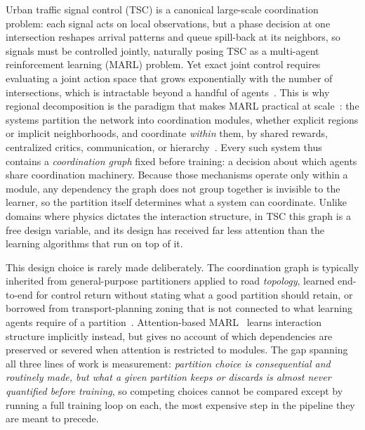\documentclass[journal]{IEEEtran}
\theoremstyle{definition}
\begin{document}
Urban traffic signal control (TSC) is a canonical large-scale coordination problem: each signal acts on local observations, but a phase decision at one intersection reshapes arrival patterns and queue spill-back at its neighbors, so signals must be controlled jointly, naturally posing TSC as a multi-agent reinforcement learning (MARL) problem. Yet exact joint control requires evaluating a joint action space that grows exponentially with the number of intersections, which is intractable beyond a handful of agents~\citep{nair2005ndpomdp,kok2006ndpomdp,oliehoek2012ndpomdp}. This is why regional decomposition is the paradigm that makes MARL practical at scale~\citep{qu2020average,qu2022scalable}: the systems partition the network into coordination modules, whether explicit regions or implicit neighborhoods, and coordinate \emph{within} them, by shared rewards, centralized critics, communication, or hierarchy~\citep{ma2020fma2c,wei2019colight,xu2021hilight,zhu2026halo}. Every such system thus contains a \emph{coordination graph} fixed before training: a decision about which agents share coordination machinery. Because those mechanisms operate only within a module, any dependency the graph does not group together is invisible to the learner, so the partition itself determines what a system can coordinate. Unlike domains where physics dictates the interaction structure, in TSC this graph is a free design variable, and its design has received far less attention than the learning algorithms that run on top of it.

This design choice is rarely made deliberately. The coordination graph is typically inherited from general-purpose partitioners applied to road \emph{topology}, learned end-to-end for control return without stating what a good partition should retain, or borrowed from transport-planning zoning that is not connected to what learning agents require of a partition~\citep{laplacian2009ieee,communitydetection2021plosone,liu2023gplight,ma2022feudal,odflow2019partition,mfdpartition2020}.
Attention-based MARL~\citep{jiang2018atoc,wei2019colight} learns interaction structure implicitly instead, but gives no account of which dependencies are preserved or severed when attention is restricted to modules.
The gap spanning all three lines of work is measurement: \emph{partition choice is consequential and routinely made, but what a given partition keeps or discards is almost never quantified before training}, so competing choices cannot be compared except by running a full training loop on each, the most expensive step in the pipeline they are meant to precede.
\end{document}
